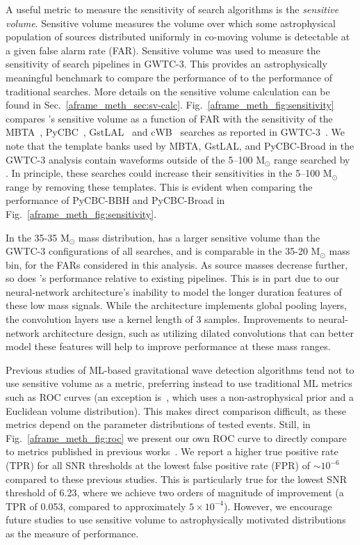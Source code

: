 \begin{refsection}
A useful metric to measure the sensitivity of search algorithms is the \emph{sensitive volume}. 
Sensitive volume measures the volume over which some astrophysical population of sources distributed uniformly in co-moving volume is detectable at a given false alarm rate (FAR). 
Sensitive volume was used to measure the sensitivity of search pipelines in GWTC-3. 
This provides an astrophysically meaningful benchmark to compare the performance of \aframe to the performance of traditional searches. 
More details on the sensitive volume calculation can be found in Sec.~\ref{aframe_meth_sec:sv-calc}. 
Fig.~\ref{aframe_meth_fig:sensitivity} compares \aframe's sensitive volume as a function of FAR with the sensitivity of the MBTA~\cite{Aubin_2021}, PyCBC~\cite{Dal_Canton_2021}, GstLAL~\cite{Ewing:2023qqe, Tsukada_2023} and cWB~\cite{DRAGO2021100678} searches as reported in GWTC-3~\cite{Abbott_2023}. 
We note that the template banks used by MBTA, GstLAL, and PyCBC-Broad in the GWTC-3 analysis contain waveforms outside of the 5--100 M$_{\odot}$ range searched by \aframe. 
In principle, these searches could increase their sensitivities in the 5--100 M$_{\odot}$ range by removing these templates. 
This is evident when comparing the performance of PyCBC-BBH and PyCBC-Broad in Fig.~\ref{aframe_meth_fig:sensitivity}.

In the 35-35 M$_{\odot}$ mass distribution, \aframe has a larger sensitive volume than the GWTC-3 configurations of all searches, and is comparable in the 35-20 M$_{\odot}$ mass bin, for the FARs considered in this analysis. 
As source masses decrease further, so does \aframe's performance relative to existing pipelines. 
This is in part due to our neural-network architecture's inability to model the longer duration features of these low mass signals. 
While the architecture implements global pooling layers, the convolution layers use a kernel length of 3 samples. 
Improvements to neural-network architecture design, such as utilizing dilated convolutions that can better model these features will help to improve performance at these mass ranges.

Previous studies of ML-based gravitational wave detection algorithms tend not to use sensitive volume as a metric, preferring instead to use traditional ML metrics such as ROC curves (an exception is~\cite{ml_mdc}, which uses a non-astrophysical prior and a Euclidean volume distribution). 
This makes direct comparison difficult, as these metrics depend on the parameter distributions of tested events. 
Still, in Fig.~\ref{aframe_meth_fig:roc} we present our own ROC curve to directly compare to metrics published in previous works~\cite{huerta2021, Chaturvedi_2022}. 
We report a higher true positive rate (TPR) for all SNR thresholds at the lowest false positive rate (FPR) of $\sim10^{-6}$ compared to these previous studies. 
This is particularly true for the lowest SNR threshold of 6.23, where we achieve two orders of magnitude of improvement (a TPR of 0.053, compared to approximately $5\times10^{-4}$). 
However, we encourage future studies to use sensitive volume to astrophysically motivated distributions as the measure of performance.



\end{refsection}
